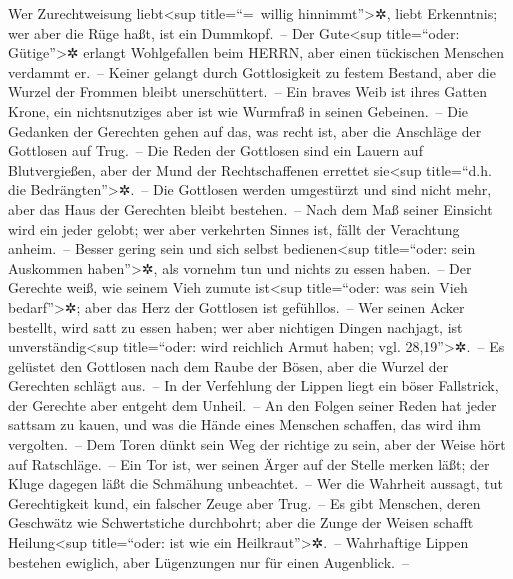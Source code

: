 Wer Zurechtweisung liebt\textless sup title=``=~willig
hinnimmt''\textgreater✲, liebt Erkenntnis; wer aber die Rüge haßt, ist
ein Dummkopf.~-- Der Gute\textless sup title=``oder:
Gütige''\textgreater✲ erlangt Wohlgefallen beim HERRN, aber einen
tückischen Menschen verdammt er.~-- Keiner gelangt durch
Gottlosigkeit zu festem Bestand, aber die Wurzel der Frommen bleibt
unerschüttert.~-- Ein braves Weib ist ihres Gatten Krone,
ein nichtsnutziges aber ist wie Wurmfraß in seinen Gebeinen.~--
Die Gedanken der Gerechten gehen auf das, was recht ist,
aber die Anschläge der Gottlosen auf Trug.~-- Die Reden
der Gottlosen sind ein Lauern auf Blutvergießen, aber der Mund der
Rechtschaffenen errettet sie\textless sup title=``d.h. die
Bedrängten''\textgreater✲.~-- Die Gottlosen werden
umgestürzt und sind nicht mehr, aber das Haus der Gerechten bleibt
bestehen.~-- Nach dem Maß seiner Einsicht wird ein jeder
gelobt; wer aber verkehrten Sinnes ist, fällt der Verachtung anheim.~--
Besser gering sein und sich selbst bedienen\textless sup
title=``oder: sein Auskommen haben''\textgreater✲, als vornehm tun und
nichts zu essen haben.~-- Der Gerechte weiß, wie seinem
Vieh zumute ist\textless sup title=``oder: was sein Vieh
bedarf''\textgreater✲; aber das Herz der Gottlosen ist gefühllos.~--
Wer seinen Acker bestellt, wird satt zu essen haben; wer
aber nichtigen Dingen nachjagt, ist unverständig\textless sup
title=``oder: wird reichlich Armut haben; vgl. 28,19''\textgreater✲.~--
Es gelüstet den Gottlosen nach dem Raube der Bösen, aber
die Wurzel der Gerechten schlägt aus.~-- In der
Verfehlung der Lippen liegt ein böser Fallstrick, der Gerechte aber
entgeht dem Unheil.~-- An den Folgen seiner Reden hat
jeder sattsam zu kauen, und was die Hände eines Menschen schaffen, das
wird ihm vergolten.~-- Dem Toren dünkt sein Weg der
richtige zu sein, aber der Weise hört auf Ratschläge.~--
Ein Tor ist, wer seinen Ärger auf der Stelle merken läßt;
der Kluge dagegen läßt die Schmähung unbeachtet.~-- Wer
die Wahrheit aussagt, tut Gerechtigkeit kund, ein falscher Zeuge aber
Trug.~-- Es gibt Menschen, deren Geschwätz wie
Schwertstiche durchbohrt; aber die Zunge der Weisen schafft
Heilung\textless sup title=``oder: ist wie ein
Heilkraut''\textgreater✲.~-- Wahrhaftige Lippen bestehen
ewiglich, aber Lügenzungen nur für einen Augenblick.~--

